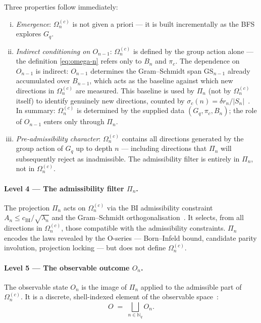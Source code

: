 \documentclass[11pt,a4paper]{article}
\begin{document}
      Three properties follow immediately:
      \begin{enumerate}[(i)]
\item \emph{Emergence}: $\Omega_n^{(c)}$ is not given a priori — it is built
incrementally as the BFS explores $G_q$.
\item \emph{Indirect conditioning on $O_{n-1}$}:
$\Omega_n^{(c)}$ is defined by the group action alone — the definition
\eqref{eq:omega-n} refers only to $B_n$ and $\pi_c$.
The dependence on $O_{n-1}$ is indirect: $O_{n-1}$ determines the
Gram--Schmidt span $\mathrm{GS}_{n-1}$ already accumulated over $B_{n-1}$,
which acts as the baseline against which new directions in $\Omega_n^{(c)}$
are measured.
This baseline is used by $\Pi_n$ (not by $\Omega_n^{(c)}$ itself) to
identify genuinely new directions, counted by $\sigma_c(n) = \delta r_n / |S_n|$~\cite{Beau2026a16}.
In summary: $\Omega_n^{(c)}$ is determined by the supplied data
$(G_q,\pi_c,B_n)$;
the role of $O_{n-1}$ enters only through $\Pi_n$.
\item \emph{Pre-admissibility character}:
$\Omega_n^{(c)}$ contains all directions generated by the group action
of $G_q$ up to depth $n$ — including directions that $\Pi_n$ will
subsequently reject as inadmissible.
The admissibility filter is entirely in $\Pi_n$, not in $\Omega_n^{(c)}$.
      \end{enumerate}

    \paragraph{Level 4 — The admissibility filter $\Pi_n$.}
      The projection $\Pi_n$ acts on $\Omega_n^{(c)}$ via the BI admissibility
      constraint $A_n \leq c_{\mathrm{BI}}/\sqrt{\lambda_n}$ and the Gram--Schmidt
      orthogonalisation~\cite{Beau2026a16,Beau2026a26}.
      It selects, from all directions in $\Omega_n^{(c)}$, those compatible with
      the admissibility constraints.
      $\Pi_n$ encodes the laws revealed by the O-series — Born--Infeld bound,
      candidate parity involution, projection locking — but does not define $\Omega_n^{(c)}$.

    \paragraph{Level 5 — The observable outcome $O_n$.}
      The observable state $O_n$ is the image of $\Pi_n$ applied to the admissible
      part of $\Omega_n^{(c)}$.
      It is a discrete, shell-indexed element of the observable
      space~\cite{Beau2026a26}:
      \begin{equation}
        O \;=\; \bigsqcup_{n \in \mathbb{N}_q} O_n.
      \end{equation}
\end{document}
